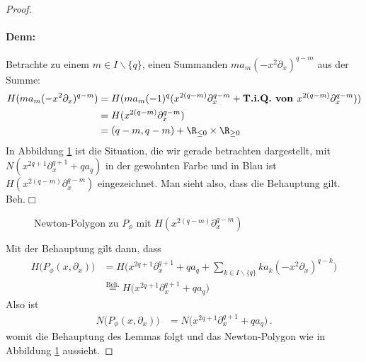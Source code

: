 \begin{proof}
\paragraph{Denn:}
Betrachte zu einem $m\in I\backslash \{q\}$, einen Summanden
$ma_m(-x^2\partial_x)^{q-m}$ aus der Summe:
\begin{align*}
H(ma_m(-x^2\partial_x)^{q-m}) &= H(ma_m(-1)^q(x^{2(q-m)}\partial_x^{q-m}
  +\textbf{T.i.Q. von }x^{2(q-m)}\partial_x^{q-m}))
\\&=H(x^{2(q-m)}\partial_x^{q-m})
\\&=(q-m,q-m) + \R_{\leq 0}\times \R_{\geq 0}
\end{align*}
In Abbildung \ref{fig:Newton-PolygonP_phi} ist die Situation, die wir gerade
betrachten dargestellt, mit $N(x^{2q + 1}\partial_x^{q + 1} + qa_q)$ in der
gewohnten Farbe und in Blau ist $H(x^{2(q-m)}\partial_x^{q-m})$ eingezeichnet.
Man sieht also, dass die Behauptung gilt.
\hfill Beh.\ensuremath{\Box}

\begin{figure}[htbp] %
\begin{center}
\end{center}
\caption{Newton-Polygon zu $P_{\phi}$ mit $H(x^{2(q-m)}\partial_x^{q-m})$}
\label{fig:Newton-PolygonP_phi}
\end{figure}
Mit der Behauptung gilt dann, dass
\begin{align*}
H\Big(P_{\phi}(x,\partial_x)\Big)
  &= H\Big(x^{2q + 1}\partial_x^{q + 1} + qa_q
  + \sum_{k\in I\backslash\{q\}}k a_k(-x^2\partial_x)^{q-k} \Big)
\\&\overset{\text{Beh.}}{=} H\Big(x^{2q + 1}\partial_x^{q + 1} + qa_q \Big)
\end{align*}
Also ist
\begin{align*}
N\Big(P_{\phi}(x,\partial_x)\Big)
  &= N\Big(x^{2q + 1}\partial_x^{q + 1} + qa_q \Big) \,.
\end{align*}
womit die Behauptung des Lemmas folgt und das Newton-Polygon wie in Abbildung
\ref{fig:Newton-PolygonP_phi} aussieht.
\end{proof}
